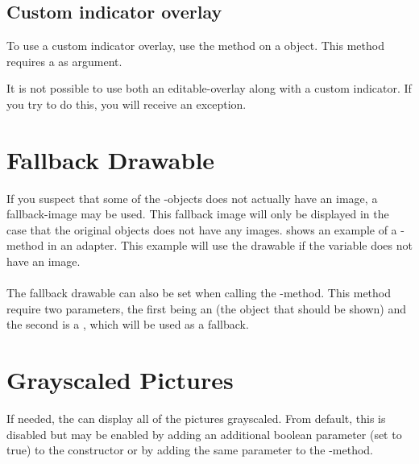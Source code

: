 \subsection{Custom indicator overlay}
To use a custom indicator overlay, use the method  on a  object. This method requires a  as argument. 

\begin{note}
    It is not possible to use both an editable-overlay along with a custom indicator. If you try to do this, you will receive an exception.
\end{note}


\section{Fallback Drawable}
\label{sec:fallback_drawable}
If you suspect that some of the -objects does not actually have an image, a fallback-image may be used. This fallback image will only be displayed in the case that the original objects does not have any images.  shows an example of a -method in an adapter. This example will use the drawable  if the variable  does not have an image. 
\\\\
The fallback drawable can also be set when calling the -method. This method require two parameters, the first being an  (the object that should be shown) and the second is a , which will be used as a fallback.

 


\section{Grayscaled Pictures}
\label{sec:grayscaled_pictures}
If needed, the  can display all of the pictures grayscaled. From default, this is disabled but may be enabled by adding an additional boolean parameter (set to true) to the constructor or by adding the same parameter to the -method.


